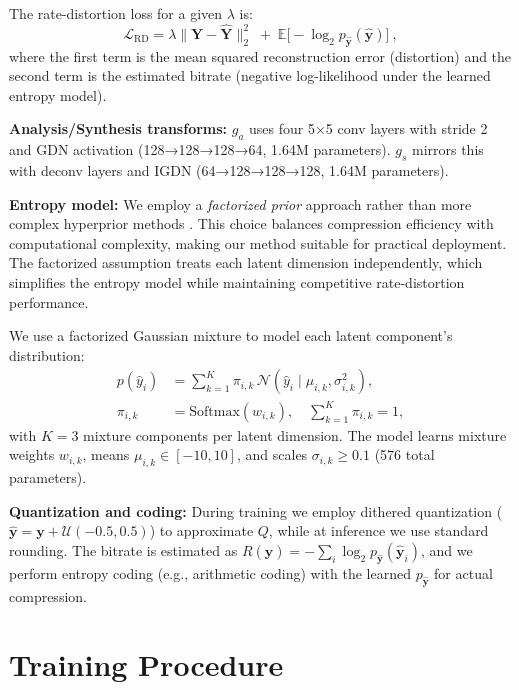 \documentclass[conference]{IEEEtran}
\begin{document}
The rate-distortion loss for a given $\lambda$ is:
\begin{equation}
\mathcal{L}_{\text{RD}} = \lambda \|\mathbf{Y} - \hat{\mathbf{Y}}\|_2^2 \;+\; \mathbb{E}\big[-\log_2 p_{\hat{\mathbf{y}}}(\hat{\mathbf{y}})\big]~,
\end{equation}
where the first term is the mean squared reconstruction error (distortion) and the second term is the estimated bitrate (negative log-likelihood under the learned entropy model).

\textbf{Analysis/Synthesis transforms:} $g_a$ uses four 5×5 conv layers with stride 2 and GDN activation (128→128→128→64, 1.64M parameters). $g_s$ mirrors this with deconv layers and IGDN (64→128→128→128, 1.64M parameters).

\textbf{Entropy model:}
We employ a \textit{factorized prior} approach \cite{balle2018variational} rather than more complex hyperprior methods \cite{minnen2018joint}. This choice balances compression efficiency with computational complexity, making our method suitable for practical deployment. The factorized assumption treats each latent dimension independently, which simplifies the entropy model while maintaining competitive rate-distortion performance.

We use a factorized Gaussian mixture to model each latent component's distribution:
\begin{align}
p(\hat{y}_i) &= \sum_{k=1}^{K} \pi_{i,k}\, \mathcal{N}(\hat{y}_i \mid \mu_{i,k}, \sigma^2_{i,k}), \\
\pi_{i,k} &= \text{Softmax}(w_{i,k}), \quad \sum_{k=1}^{K}\pi_{i,k}=1,
\end{align}
with $K=3$ mixture components per latent dimension. The model learns mixture weights $w_{i,k}$, means $\mu_{i,k} \in [-10, 10]$, and scales $\sigma_{i,k} \ge 0.1$ (576 total parameters).

\textbf{Quantization and coding:}
During training we employ dithered quantization ($\hat{\mathbf{y}} = \mathbf{y} + \mathcal{U}(-0.5,0.5)$) to approximate $Q$, while at inference we use standard rounding. The bitrate is estimated as $R(\hat{\mathbf{y}}) = -\sum_i \log_2 p_{\hat{\mathbf{y}}}(\hat{\mathbf{y}}_i)$, and we perform entropy coding (e.g., arithmetic coding) with the learned $p_{\hat{\mathbf{y}}}$ for actual compression.


\section{Training Procedure}
\end{document}
